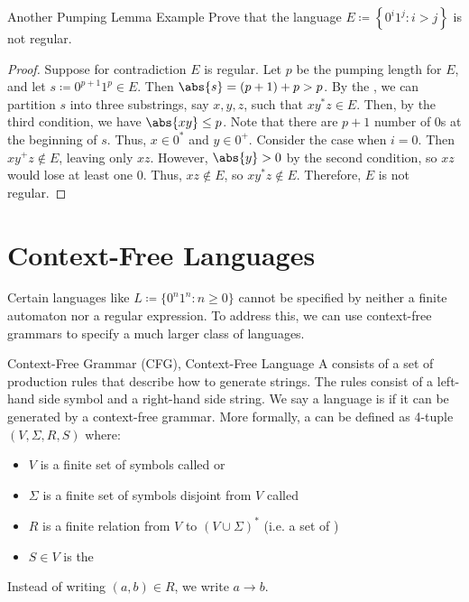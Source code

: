 \documentclass[math]{amznotes}
\begin{document}
\begin{exbox}{Another Pumping Lemma Example}{}
    Prove that the language $E \coloneq \left\{ 0^i 1^j : i > j \right\}$ is not regular.
    \tcblower
    \begin{proof}
        Suppose for contradiction $E$ is regular. Let $p$ be the pumping length for $E$, and let $s \coloneq 0^{p+1}1^p \in E$. Then $\abs{s} = (p+1) + p > p$. By the , we can partition $s$ into three substrings, say $x,y,z$, such that $x  y^*  z \in E$. Then, by the third condition, we have $\abs{x  y} \leq p$. Note that there are $p+1$ number of $0$s at the beginning of $s$. Thus, $x \in 0^*$ and $y \in 0^+$. Consider the case when $i = 0$. Then $x  y^+  z \notin E$, leaving only $x  z$. However, $\abs{y} > 0$ by the second condition, so $x  z$ would lose at least one $0$. Thus, $x  z \notin E$, so $x  y^*  z \notin E$. Therefore, $E$ is not regular.
    \end{proof}
\end{exbox}

\chapter{Context-Free Languages}
Certain languages like $L \coloneq \{ 0^n 1^n : n \geq 0 \}$ cannot be specified by neither a finite automaton nor a regular expression. To address this, we can use context-free grammars to specify a much larger class of languages.

\begin{dfnbox}{Context-Free Grammar (CFG), Context-Free Language}{}
    A  consists of a set of production rules that describe how to generate strings. The rules consist of a left-hand side symbol and a right-hand side string. We say a language is  if it can be generated by a context-free grammar.
    \tcblower
    More formally, a  can be defined as 4-tuple $(V, \Sigma, R, S)$ where:
    \begin{itemize}[noitemsep]
        \item $V$ is a finite set of symbols called  or 
        \item $\Sigma$ is a finite set of symbols disjoint from $V$ called 
        \item $R$ is a finite relation from $V$ to $(V \cup \Sigma)^*$ (i.e. a set of )
        \item $S \in V$ is the 
    \end{itemize}
    Instead of writing $(a, b) \in R$, we write $a \to b$.
\end{dfnbox}
\end{document}
